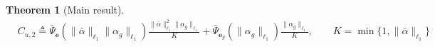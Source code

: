 \documentclass{article}
\def\rve{{\mathbf{e}}}
\newtheorem{theorem}{Theorem}[section]
\newcommand{\e}{\mathbf{e}}
\begin{document}
\begin{theorem}[Main result]
\begin{equation}
\begin{aligned}
        & C_{u,2} \triangleq \bar{\Psi}_{\rve}(\|\bar{\alpha}\|_{\ell_1}\|\alpha_g\|_{\ell_1})
        \frac{\|\bar{\alpha}\|_{\ell_1}^2\|\alpha_g\|_{\ell_1}}{K}+
        \bar{\Psi}_{\e_g}(\|\alpha_g\|_{\ell_1}) \frac{\|\alpha_g\|_{\ell_1}}{K},  \quad
        \quad K=\min\{1,\|\bar{\alpha}\|_{\ell_1}\}
   \end{aligned}
    \end{equation}


\end{theorem}
\end{document}
